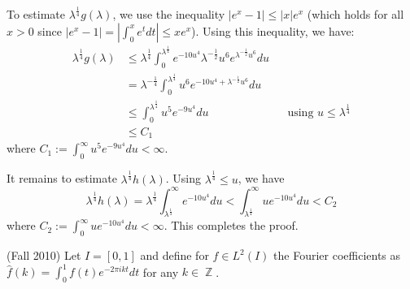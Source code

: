 \documentclass[answers]{exam}
\DeclareMathOperator{\ZZ}{\mathbb{Z}}
\begin{document}
\begin{questions}
\begin{solution}
  To estimate $\lambda^{\frac{1}{4}}g(\lambda)$, we use the inequality $|e^{x}-1|\leq |x|e^{x}$  (which holds for all $x>0$ since $|e^{x}-1|=|\int_{0}^{x}e^{t}dt|\leq xe^{x}$). Using this inequality, we have:
   \begin{align*}
     \lambda^{\frac{1}{4}}g(\lambda)
     &\leq \lambda^{\frac{1}{4}}\int_{0}^{\lambda^{\frac{1}{4}}} e^{-10u^{4}}\lambda^{-\frac{1}{2}}u^{6}e^{\lambda^{-\frac{1}{2}}u^{6}}du\\
     &=\lambda^{-\frac{1}{4}}\int_{0}^{\lambda^{\frac{1}{4}}} u^{6}e^{-10u^{4}+\lambda^{-\frac{1}{2}}u^{6}}du\\
     &\leq \int_{0}^{\lambda^{\frac{1}{4}}} u^{5}e^{-9u^{4}}du &&\text{using }u\leq \lambda^{\frac{1}{4}}\\
     &\leq  C_{1}
   \end{align*}
   where $C_{1} := \int_{0}^{\infty} u^{5}e^{-9u^{4}}du<\infty$.
   
   It remains to estimate $\lambda^{\frac{1}{4}}h(\lambda)$. Using $\lambda^{\frac{1}{4}}\leq u$, we have
   \begin{equation*}
     \lambda^{\frac{1}{4}}h(\lambda)
      = \lambda^{\frac{1}{4}}\int_{\lambda^{\frac{1}{4}}}^{\infty}e^{-10u^{4}}du
     < \int_{\lambda^{\frac{1}{4}}}^{\infty}ue^{-10 u^{4}}du < C_{2}
   \end{equation*}
   where $C_{2} := \int_{0}^{\infty}ue^{-10u^{4}}du<\infty$. This completes the proof.
 \end{solution}

\question (Fall 2010)
Let $I = [0,1]$ and define for $f\in L^{2}(I)$ the Fourier coefficients as $\hat{f}(k) =\int_{0}^{1}f(t)e^{-2\pi i k t}dt$ for any $k\in \ZZ$. 


\end{questions}
\end{document}
